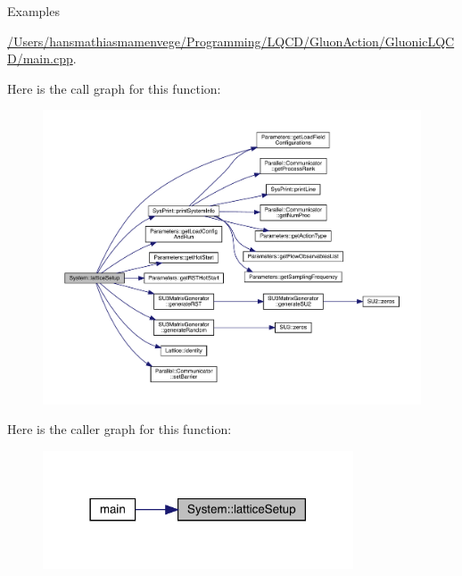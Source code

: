 \begin{Desc}
\item[Examples]\par
\mbox{\hyperlink{_2_users_2hansmathiasmamenvege_2_programming_2_l_q_c_d_2_gluon_action_2_gluonic_l_q_c_d_2main_8cpp-example}{/\+Users/hansmathiasmamenvege/\+Programming/\+L\+Q\+C\+D/\+Gluon\+Action/\+Gluonic\+L\+Q\+C\+D/main.\+cpp}}.\end{Desc}
Here is the call graph for this function\+:
\nopagebreak
\begin{figure}[H]
\begin{center}
\leavevmode
\includegraphics[width=350pt]{class_system_a93c8a8258ac8f6382ec393bca1271011_cgraph}
\end{center}
\end{figure}
Here is the caller graph for this function\+:
\nopagebreak
\begin{figure}[H]
\begin{center}
\leavevmode
\includegraphics[width=261pt]{class_system_a93c8a8258ac8f6382ec393bca1271011_icgraph}
\end{center}
\end{figure}
\mbox{\label{class_system_afa39feb75f96798930f4bfb48205f40b}} 
